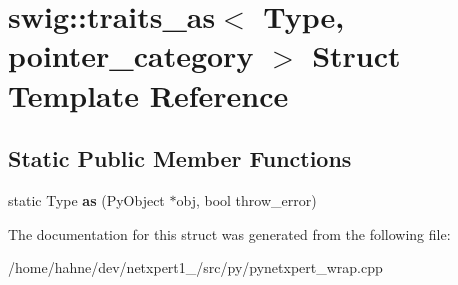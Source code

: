 \hypertarget{structswig_1_1traits__as_3_01Type_00_01pointer__category_01_4}{}\section{swig\+:\+:traits\+\_\+as$<$ Type, pointer\+\_\+category $>$ Struct Template Reference}
\label{structswig_1_1traits__as_3_01Type_00_01pointer__category_01_4}
\subsection*{Static Public Member Functions}
\begin{DoxyCompactItemize}
\item 
static Type {\bfseries as} (Py\+Object $\ast$obj, bool throw\+\_\+error)\hypertarget{structswig_1_1traits__as_3_01Type_00_01pointer__category_01_4_af4d6146e7890c389c1a8c87ff57a0366}{}\label{structswig_1_1traits__as_3_01Type_00_01pointer__category_01_4_af4d6146e7890c389c1a8c87ff57a0366}

\end{DoxyCompactItemize}


The documentation for this struct was generated from the following file\+:\begin{DoxyCompactItemize}
\item 
/home/hahne/dev/netxpert1\+\_/src/py/pynetxpert\+\_\+wrap.\+cpp\end{DoxyCompactItemize}
